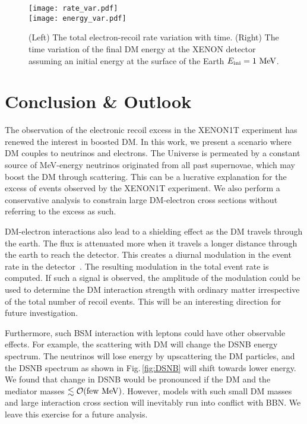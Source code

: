 \documentclass[prd,aps,twocolumn,tightenlines,notitlepage,nofootinbib,preprintnumbers,letterpaper,superscriptaddress]{revtex4-2}
\newcommand{\MeV}{{\rm\ MeV}}
\begin{document}
\begin{figure}[!t]
    \centering
    \texttt{[image: rate\_var.pdf]}\\\texttt{[image: energy\_var.pdf]}
    \caption{(Left) The total electron-recoil rate variation with time. (Right) The time variation of the final DM energy at the XENON detector assuming an initial energy at the surface of the Earth $E_\mathrm{ini}=1\MeV$.}
    \label{fig:vars}
\end{figure}
\section{Conclusion \& Outlook }
The observation of the electronic recoil excess in the XENON1T experiment has renewed the interest in boosted DM. 
In this work, we present a scenario where DM couples to neutrinos and electrons. The Universe is permeated by a constant source of  MeV-energy neutrinos originated from all past supernovae, which may boost the DM through scattering. This can be a lucrative explanation for the excess of events observed by the XENON1T experiment. We also perform a conservative analysis to constrain large DM-electron cross sections without referring to the excess as such.

DM-electron interactions also lead to a shielding effect as the DM travels through the earth. The flux is attenuated more when it travels a longer distance through the earth to reach the detector. This creates a diurnal modulation in the event rate in the detector~\cite{Fornal_2020}. The resulting modulation in the total event rate is computed. If such a signal is observed, the amplitude of the modulation could be used to determine the DM interaction strength with ordinary matter irrespective of the total number of recoil events. This will be an interesting direction for future investigation.

Furthermore, such BSM interaction with leptons could have other observable effects. For example, the scattering with DM will change the DSNB energy spectrum. The neutrinos will lose energy by upscattering the DM particles, and the DSNB spectrum as shown in Fig.\,\ref{fig:DSNB} will shift towards lower energy. We found that change in DSNB would be pronounced if the DM and the mediator masses $\lesssim\mathcal{O}(\text{few}\MeV)$. However, models with such small DM masses and large interaction cross section will inevitably run into conflict with BBN. We leave this exercise for a future analysis. 
\end{document}
